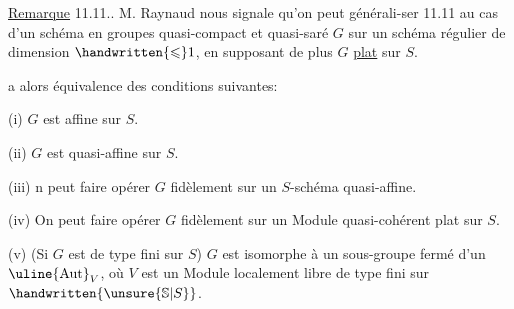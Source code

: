 \uline{Remarque} 11.11..  M. Raynaud nous signale qu'on peut générali-\linebreak ser 11.11 au cas d'un schéma en groupes quasi-compact et quasi-saré $G$ sur un schéma régulier de dimension $\handwritten{\leqslant}1$, en supposant de plus $G$ \uline{plat} sur $S$.  a alors équivalence des conditions suivantes:

(i) $G$ est affine sur $S$.

(ii) $G$ est quasi-affine sur $S$.

(iii) n peut faire opérer $G$ fidèlement sur un $S$-schéma quasi-affine.

(iv) On peut faire opérer $G$ fidèlement sur un Module quasi-cohérent plat sur $S$.

(v) (Si $G$ est de type fini sur $S$) $G$ est isomorphe à un sous-groupe fermé d'un $\text{\uline{Aut}}_V$, où $V$ est un Module localement libre de type fini sur $\handwritten{\unsure{\mathbb{S}|S}}$.


